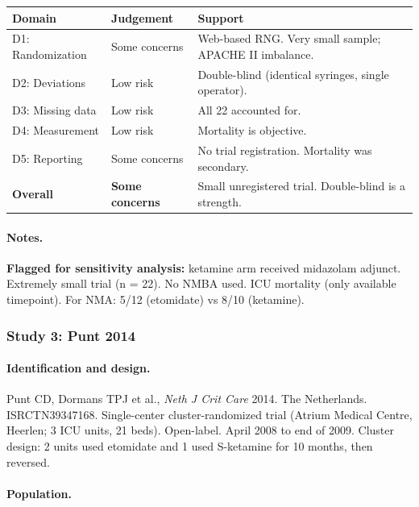 \documentclass[11pt]{article}
\begin{document}
\begin{table}[H]
\centering\footnotesize
\begin{tabularx}{\textwidth}{L{3cm} C{2cm} X}
\toprule
\textbf{Domain} & \textbf{Judgement} & \textbf{Support} \\
\midrule
D1: Randomization & Some concerns & Web-based RNG. Very small sample; APACHE II imbalance. \\
D2: Deviations & Low risk & Double-blind (identical syringes, single operator). \\
D3: Missing data & Low risk & All 22 accounted for. \\
D4: Measurement & Low risk & Mortality is objective. \\
D5: Reporting & Some concerns & No trial registration. Mortality was secondary. \\
\textbf{Overall} & \textbf{Some concerns} & Small unregistered trial. Double-blind is a strength. \\
\bottomrule
\end{tabularx}
\end{table}

\paragraph{Notes.}
\textbf{Flagged for sensitivity analysis:} ketamine arm received midazolam adjunct. Extremely small trial (n = 22). No NMBA used. ICU mortality (only available timepoint). For NMA: 5/12 (etomidate) vs 8/10 (ketamine).

\bigskip

\subsubsection{Study 3: Punt 2014}

\paragraph{Identification and design.}
Punt CD, Dormans TPJ et al., \textit{Neth J Crit Care} 2014. The Netherlands. ISRCTN39347168. Single-center cluster-randomized trial (Atrium Medical Centre, Heerlen; 3 ICU units, 21 beds). Open-label. April 2008 to end of 2009. Cluster design: 2 units used etomidate and 1 used S-ketamine for 10 months, then reversed.

\paragraph{Population.}
\end{document}
